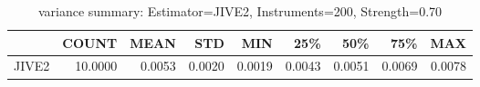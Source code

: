 \begin{table}[ht]
\centering
\caption{variance summary: Estimator=JIVE2, Instruments=200, Strength=0.70}
\begin{tabular}{lrrrrrrrr}
\toprule
 & COUNT & MEAN & STD & MIN & 25\% & 50\% & 75\% & MAX \\
\midrule
JIVE2 & 10.0000 & 0.0053 & 0.0020 & 0.0019 & 0.0043 & 0.0051 & 0.0069 & 0.0078 \\
\bottomrule
\end{tabular}
\end{table}
